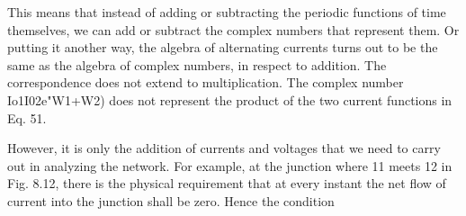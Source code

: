 This means that instead of adding or subtracting the periodic functions
of time themselves, we can add or subtract the complex numbers
that represent them. Or putting it another way, the algebra of alternating
currents turns out to be the same as the algebra of complex
numbers, in respect to addition. The correspondence does not extend
to multiplication. The complex number Io1I02e"W1+W2) does not
represent the product of the two current functions in Eq. 51.

However, it is only the addition of currents and voltages that we
need to carry out in analyzing the network. For example, at the
junction where 11 meets 12 in Fig. 8.12, there is the physical requirement
that at every instant the net flow of current into the junction
shall be zero. Hence the condition

\begin{equation}
\end{equation}
